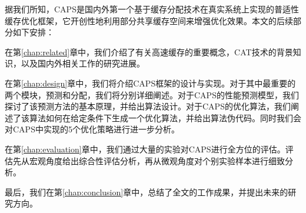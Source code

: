 据我们所知，CAPS是国内外第一个基于缓存分配技术在真实系统上实现的普适性缓存优化框架，它开创性地利用部分共享缓存空间来增强优化效果。本文的后续部分如下安排：

在第\ref{chap:related}章中，我们介绍了有关高速缓存的重要概念，CAT技术的背景知识，以及国内外相关工作的研究进展。

在第\ref{chap:design}章中，我们将介绍CAPS框架的设计与实现。对于其中最重要的两个模块，预测和分配，我们将分别详细阐述。对于CAPS的性能预测模型，我们探讨了该预测方法的基本原理，并给出算法设计。对于CAPS的优化算法，我们阐述了该算法如何在给定条件下生成一个优化算法，并给出算法伪代码。同时我们会对CAPS中实现的5个优化策略进行进一步分析。

在第\ref{chap:evaluation}章中，我们通过大量的实验对CAPS进行全方位的评估。评估先从宏观角度给出综合性评估分析，再从微观角度对个别实验样本进行细致分析。

最后，我们在第\ref{chap:conclusion}章中，总结了全文的工作成果，并提出未来的研究方向。